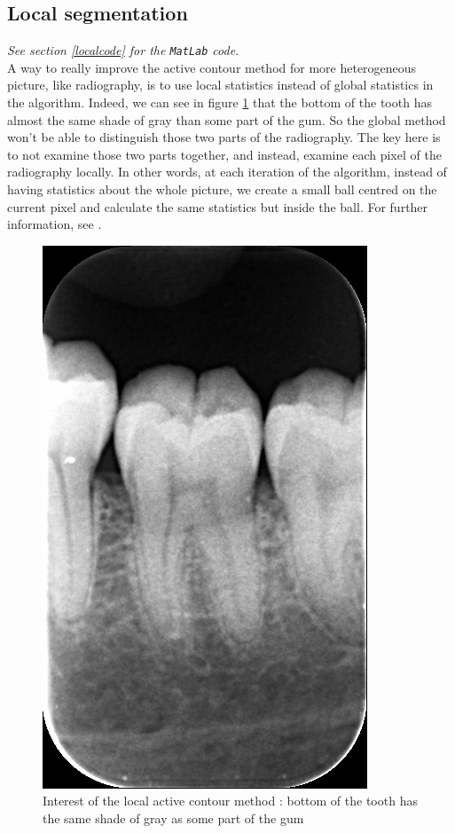 \subsection{Local segmentation}
\textit{See section \ref{localcode} for the \texttt{MatLab} code}.\\
A way to really improve the active contour method for more heterogeneous picture, like radiography, is to use local statistics instead of global statistics in the algorithm. Indeed, we can see in figure \ref{interestLocal} that the bottom of the tooth has almost the same shade of gray than some part of the gum. So the global method won't be able to distinguish those two parts of the radiography. The key here is to not examine those two parts together, and instead, examine each pixel of the radiography locally. In other words, at each iteration of the algorithm, instead of having statistics about the whole picture, we create a small ball centred on the current pixel and calculate the same statistics but inside the ball. For further information, see \cite{lanktonLO}. 

\begin{figure}[H]
\centering
\includegraphics[scale=1.8]{images/rx1.png}
\caption{Interest of the local active contour method : bottom of the tooth has the same shade of gray as some part of the gum}
\label{interestLocal}
\end{figure}

